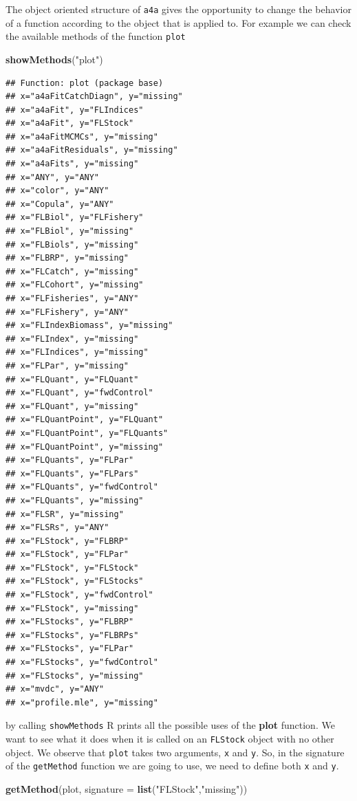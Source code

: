 \documentclass[
]{book}
\newenvironment{Shaded}{\begin{snugshade}}{\end{snugshade}}
\newcommand{\AttributeTok}[1]{\textcolor[rgb]{0.13,0.29,0.53}{#1}}
\newcommand{\FunctionTok}[1]{\textcolor[rgb]{0.13,0.29,0.53}{\textbf{#1}}}
\newcommand{\NormalTok}[1]{#1}
\newcommand{\StringTok}[1]{\textcolor[rgb]{0.31,0.60,0.02}{#1}}
\begin{document}
The object oriented structure of \texttt{a4a} gives the opportunity to change the behavior of a function according to the object that is applied to. For example we can check the available methods of the function \texttt{plot}

\begin{Shaded}
\begin{Highlighting}[]
\FunctionTok{showMethods}\NormalTok{(}\StringTok{"plot"}\NormalTok{)}
\end{Highlighting}
\end{Shaded}

\begin{verbatim}
## Function: plot (package base)
## x="a4aFitCatchDiagn", y="missing"
## x="a4aFit", y="FLIndices"
## x="a4aFit", y="FLStock"
## x="a4aFitMCMCs", y="missing"
## x="a4aFitResiduals", y="missing"
## x="a4aFits", y="missing"
## x="ANY", y="ANY"
## x="color", y="ANY"
## x="Copula", y="ANY"
## x="FLBiol", y="FLFishery"
## x="FLBiol", y="missing"
## x="FLBiols", y="missing"
## x="FLBRP", y="missing"
## x="FLCatch", y="missing"
## x="FLCohort", y="missing"
## x="FLFisheries", y="ANY"
## x="FLFishery", y="ANY"
## x="FLIndexBiomass", y="missing"
## x="FLIndex", y="missing"
## x="FLIndices", y="missing"
## x="FLPar", y="missing"
## x="FLQuant", y="FLQuant"
## x="FLQuant", y="fwdControl"
## x="FLQuant", y="missing"
## x="FLQuantPoint", y="FLQuant"
## x="FLQuantPoint", y="FLQuants"
## x="FLQuantPoint", y="missing"
## x="FLQuants", y="FLPar"
## x="FLQuants", y="FLPars"
## x="FLQuants", y="fwdControl"
## x="FLQuants", y="missing"
## x="FLSR", y="missing"
## x="FLSRs", y="ANY"
## x="FLStock", y="FLBRP"
## x="FLStock", y="FLPar"
## x="FLStock", y="FLStock"
## x="FLStock", y="FLStocks"
## x="FLStock", y="fwdControl"
## x="FLStock", y="missing"
## x="FLStocks", y="FLBRP"
## x="FLStocks", y="FLBRPs"
## x="FLStocks", y="FLPar"
## x="FLStocks", y="fwdControl"
## x="FLStocks", y="missing"
## x="mvdc", y="ANY"
## x="profile.mle", y="missing"
\end{verbatim}

by calling \texttt{showMethods} R prints all the possible uses of the \textbf{plot} function. We want to see what it does when it is called on an \texttt{FLStock} object with no other object. We observe that \texttt{plot} takes two arguments, \texttt{x} and \texttt{y}. So, in the signature of the \texttt{getMethod} function we are going to use, we need to define both \texttt{x} and \texttt{y}.

\begin{Shaded}
\begin{Highlighting}[]
\FunctionTok{getMethod}\NormalTok{(}\StringTok{\textquotesingle{}plot\textquotesingle{}}\NormalTok{, }\AttributeTok{signature =} \FunctionTok{list}\NormalTok{(}\StringTok{"FLStock"}\NormalTok{,}\StringTok{"missing"}\NormalTok{))}
\end{Highlighting}
\end{Shaded}
\end{document}
